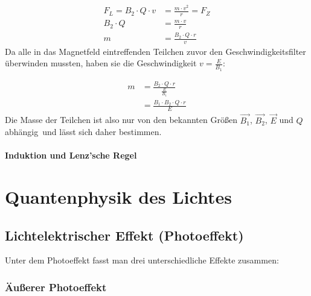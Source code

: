 \documentclass[a4paper]{article}
\begin{document}
				\begin{equation}
					\begin{aligned} 
						F_L=B_2\cdot Q \cdot v &= \frac{m\cdot v^2}{r} = F_Z\\
						B_2\cdot Q &= \frac{m\cdot v}{r}\\
						m&=\frac{B_2\cdot Q\cdot r}{v}
					\end{aligned}
				\end{equation}
				Da alle in das Magnetfeld eintreffenden Teilchen zuvor den Geschwindigkeitsfilter überwinden mussten, haben sie die Geschwindigkeit $v=\frac{E}{B_1}$:
				
				\begin{equation}
				\begin{aligned}
					m&=\frac{B_2\cdot Q\cdot r}{\frac{E}{B_1}}\\
					&=\frac{B_1\cdot B_2\cdot Q\cdot r}{E}
				\end{aligned}
				\end{equation}
				Die Masse der Teilchen ist also nur von den bekannten Größen $\vec{B_1}$, $\vec{B_2}$, $\vec{E}$ und $Q$ abhängig\ und lässt sich daher bestimmen.
				

				
			\paragraph{Induktion und Lenz'sche Regel}		%
		
	\section{Quantenphysik des Lichtes}
		\subsection{Lichtelektrischer Effekt (Photoeffekt)}
			Unter dem Photoeffekt fasst man drei unterschiedliche Effekte zusammen:
			\subsubsection{Äußerer Photoeffekt}
			
\end{document}
